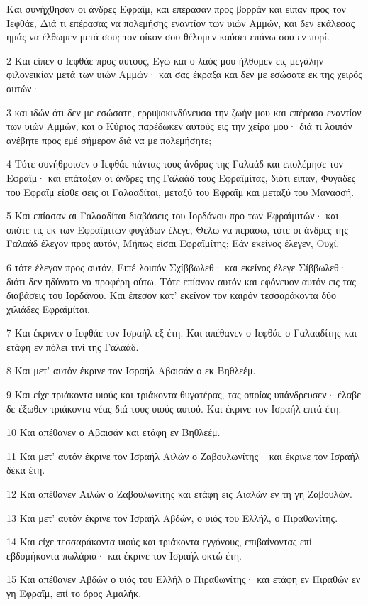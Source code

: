 \par Και συνήχθησαν οι άνδρες Εφραΐμ, και επέρασαν προς βορράν και είπαν προς τον Ιεφθάε, Διά τι επέρασας να πολεμήσης εναντίον των υιών Αμμών, και δεν εκάλεσας ημάς να έλθωμεν μετά σου; τον οίκον σου θέλομεν καύσει επάνω σου εν πυρί.
\par 2 Και είπεν ο Ιεφθάε προς αυτούς, Εγώ και ο λαός μου ήλθομεν εις μεγάλην φιλονεικίαν μετά των υιών Αμμών· και σας έκραξα και δεν με εσώσατε εκ της χειρός αυτών·
\par 3 και ιδών ότι δεν με εσώσατε, ερριψοκινδύνευσα την ζωήν μου και επέρασα εναντίον των υιών Αμμών, και ο Κύριος παρέδωκεν αυτούς εις την χείρα μου· διά τι λοιπόν ανέβητε προς εμέ σήμερον διά να με πολεμήσητε;
\par 4 Τότε συνήθροισεν ο Ιεφθάε πάντας τους άνδρας της Γαλαάδ και επολέμησε τον Εφραΐμ· και επάταξαν οι άνδρες της Γαλαάδ τους Εφραϊμίτας, διότι είπαν, Φυγάδες του Εφραΐμ είσθε σεις οι Γαλααδίται, μεταξύ του Εφραΐμ και μεταξύ του Μανασσή.
\par 5 Και επίασαν αι Γαλααδίται διαβάσεις του Ιορδάνου προ των Εφραϊμιτών· και οπότε τις εκ των Εφραϊμιτών φυγάδων έλεγε, Θέλω να περάσω, τότε οι άνδρες της Γαλαάδ έλεγον προς αυτόν, Μήπως είσαι Εφραϊμίτης; Εάν εκείνος έλεγεν, Ουχί,
\par 6 τότε έλεγον προς αυτόν, Ειπέ λοιπόν Σχίββωλεθ· και εκείνος έλεγε Σίββωλεθ· διότι δεν ηδύνατο να προφέρη ούτω. Τότε επίανον αυτόν και εφόνευον αυτόν εις τας διαβάσεις του Ιορδάνου. Και έπεσον κατ' εκείνον τον καιρόν τεσσαράκοντα δύο χιλιάδες Εφραϊμίται.
\par 7 Και έκρινεν ο Ιεφθάε τον Ισραήλ εξ έτη. Και απέθανεν ο Ιεφθάε ο Γαλααδίτης και ετάφη εν πόλει τινί της Γαλαάδ.
\par 8 Και μετ' αυτόν έκρινε τον Ισραήλ Αβαισάν ο εκ Βηθλεέμ.
\par 9 Και είχε τριάκοντα υιούς και τριάκοντα θυγατέρας, τας οποίας υπάνδρευσεν· έλαβε δε έξωθεν τριάκοντα νέας διά τους υιούς αυτού. Και έκρινε τον Ισραήλ επτά έτη.
\par 10 Και απέθανεν ο Αβαισάν και ετάφη εν Βηθλεέμ.
\par 11 Και μετ' αυτόν έκρινε τον Ισραήλ Αιλών ο Ζαβουλωνίτης· και έκρινε τον Ισραήλ δέκα έτη.
\par 12 Και απέθανεν Αιλών ο Ζαβουλωνίτης και ετάφη εις Αιαλών εν τη γη Ζαβουλών.
\par 13 Και μετ' αυτόν έκρινε τον Ισραήλ Αβδών, ο υιός του Ελλήλ, ο Πιραθωνίτης.
\par 14 Και είχε τεσσαράκοντα υιούς και τριάκοντα εγγόνους, επιβαίνοντας επί εβδομήκοντα πωλάρια· και έκρινε τον Ισραήλ οκτώ έτη.
\par 15 Και απέθανεν Αβδών ο υιός του Ελλήλ ο Πιραθωνίτης· και ετάφη εν Πιραθών εν γη Εφραΐμ, επί το όρος Αμαλήκ.

